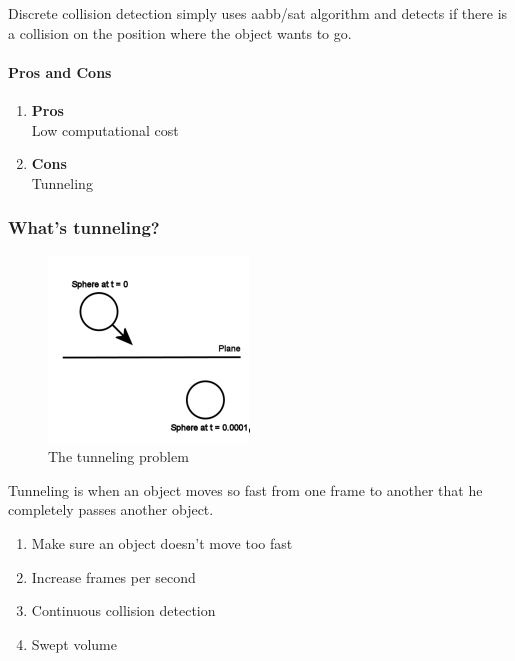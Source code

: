 \documentclass{article}
\begin{document}
    Discrete collision detection simply uses aabb/sat algorithm and detects if there is a collision on the position where the object wants to go.

    

    \paragraph{Pros and Cons}
    \begin{enumerate}
        \item \textbf{Pros}\\
        Low computational cost
        \item \textbf{Cons}\\
        Tunneling
    \end{enumerate}

    \newpage

    \subsubsection{What's tunneling?}

    \begin{figure}[H]
        \includegraphics{TunnelingProblem}
        \centering
        \caption{The tunneling problem}
        \label{fig:tunneling}
    \end{figure}

    Tunneling is when an object moves so fast from one frame to another that
    he completely passes another object.
    \begin{enumerate}
        \item Make sure an object doesn't move too fast
        \item Increase frames per second
        \item Continuous collision detection
        \item Swept volume
    \end{enumerate}
\end{document}
